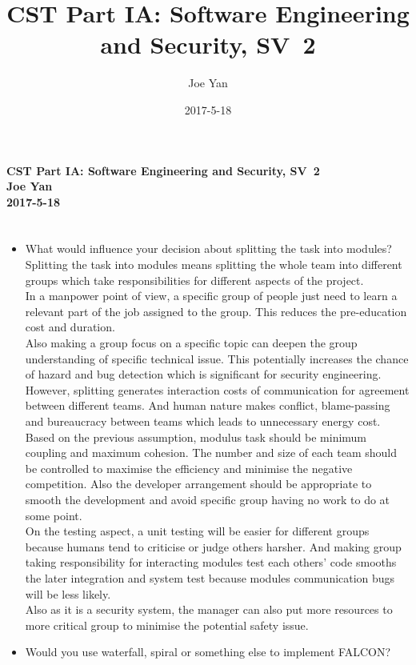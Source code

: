 \documentclass[10pt,twoside,a4paper]{article}
\newcommand{\studentname}{Joe Yan}
\newcommand{\svworkdate}{2017-5-18}
\newcommand{\svcourse}{CST Part IA: Software Engineering and Security}
\newcommand{\svnumber}{2}
\begin{document}
\author{\studentname}
\title{\svcourse, SV~\svnumber}
\date{\svworkdate}

\textbf{\svcourse, SV~\svnumber}\\
\textbf{\studentname}\\
\textbf{\svworkdate}\\

\section*{}
\begin{itemize}
\item[1] What would influence your decision about splitting the task into modules? 
\\Splitting the task into modules means splitting the whole team into different groups which take responsibilities for different aspects of the project.
\\In a manpower point of view, a specific group of people just need to learn a relevant part of the job assigned to the group. This reduces the pre-education cost and duration.
\\Also making a group focus on a specific topic can deepen the group understanding of specific technical issue. This potentially increases the chance of hazard and bug detection which is significant for security engineering.
\\However, splitting generates interaction costs of communication for agreement between different teams. And human nature makes conflict, blame-passing and bureaucracy between teams which leads to unnecessary energy cost.
\\Based on the previous assumption, modulus task should be minimum coupling and maximum cohesion. The number and size of each team should be controlled to maximise the efficiency and minimise the negative competition. Also the developer arrangement should be appropriate to smooth the development and avoid specific group having no work to do at some point.
\\On the testing aspect, a unit testing will be easier for different groups because humans tend to criticise or judge others harsher. And making group taking responsibility for interacting modules test each others' code smooths the later integration and system test because modules communication bugs will be less likely.
\\Also as it is a security system, the manager can also put more resources to more critical group to minimise the potential safety issue.
\item[2] Would you use waterfall, spiral or something else to implement FALCON? 

\end{itemize}
\end{document}
